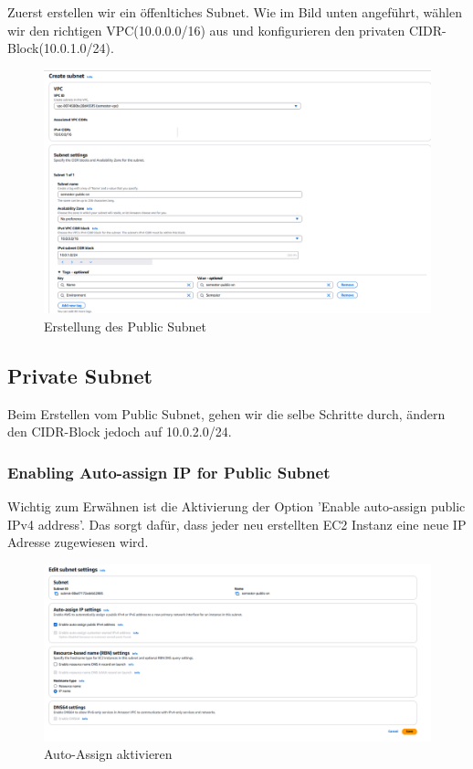 \documentclass[a4paper,12pt]{article}
\begin{document}
Zuerst erstellen wir ein öffenltiches Subnet. 
Wie im Bild unten angeführt, wählen wir den richtigen VPC(10.0.0.0/16) aus
und konfigurieren den privaten CIDR-Block(10.0.1.0/24).
\begin{figure}[H]
	\centering
	\includegraphics[width=\textwidth]{data/Create_Subnet.png}
	\caption{Erstellung des Public Subnet}
	\label{fig:Erstellung des Public Subnet}
\end{figure}

\subsection{Private Subnet}
Beim Erstellen vom Public Subnet, gehen wir die selbe Schritte durch, 
ändern den CIDR-Block jedoch auf 10.0.2.0/24.

\subsubsection{Enabling Auto-assign IP for Public Subnet}
Wichtig zum Erwähnen ist die Aktivierung der Option 'Enable auto-assign public IPv4 address'. 
Das sorgt dafür, dass jeder neu erstellten EC2 Instanz eine neue IP Adresse zugewiesen wird.
\begin{figure}[H]
	\centering
	\includegraphics[width=\textwidth]{data/Edit_subnet_enable_ipv4.png}
	\caption{Auto-Assign aktivieren}
	\label{fig:Auto-Assign aktivieren}
\end{figure}
\end{document}
